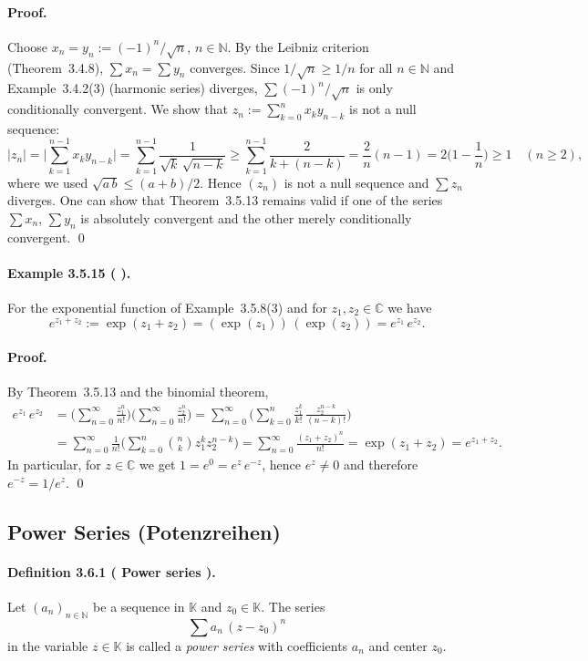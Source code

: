 \documentclass[12pt,a4paper]{article}
\newcommand{\N}{\mathbb{N}}
\newcommand{\C}{\mathbb{C}}
\newcommand{\K}{\mathbb{K}} %
\newcommand{\NumberedDefinition}[3]{%
\paragraph*{Definition #1 ( #2 ).} #3\par}
\newcommand{\NumberedExample}[3]{%
\paragraph*{Example #1 ( #2 ).} #3\par}
\theoremstyle{plain}
\theoremstyle{definition}
\theoremstyle{remark}
\begin{document}
	\paragraph{Proof.}
	Choose $x_n=y_n:=(-1)^n/\sqrt{n}$, $n\in\N$. By the Leibniz criterion (Theorem~3.4.8), $\sum x_n = \sum y_n$ converges. Since $1/\sqrt{n} \ge 1/n$ for all $n\in\N$ and Example~3.4.2(3) (harmonic series) diverges, $\sum (-1)^n/\sqrt{n}$ is only conditionally convergent. We show that $z_n := \sum_{k=0}^{n} x_k y_{n-k}$ is not a null sequence:
	\[
		|z_n| = \Bigg| \sum_{k=1}^{n-1} x_k y_{n-k} \Bigg| = \sum_{k=1}^{n-1} \frac{1}{\sqrt{k}\,\sqrt{n-k}} 
			\ge \sum_{k=1}^{n-1} \frac{2}{k+(n-k)} = \frac{2}{n}(n-1) = 2\Big(1-\frac{1}{n}\Big) \ge 1 \quad (n\ge2),
	\]
	where we used $\sqrt{a\,b} \le (a+b)/2$. Hence $(z_n)$ is not a null sequence and $\sum z_n$ diverges. One can show that Theorem~3.5.13 remains valid if one of the series $\sum x_n$, $\sum y_n$ is absolutely convergent and the other merely conditionally convergent. \qed

	\NumberedExample{3.5.15}{}{For the exponential function of Example~3.5.8(3) and for $z_1,z_2\in\C$ we have
	\[
		e^{z_1+z_2} := \exp(z_1+z_2) = (\exp(z_1))\,(\exp(z_2)) = e^{z_1}\,e^{z_2}.
	\]}
	\paragraph{Proof.}
	By Theorem~3.5.13 and the binomial theorem,
	\begin{align*}
		e^{z_1}\,e^{z_2}
			&= \Big( \sum_{n=0}^{\infty} \frac{z_1^{n}}{n!} \Big)
				 \Big( \sum_{n=0}^{\infty} \frac{z_2^{n}}{n!} \Big)
			 = \sum_{n=0}^{\infty} \Big( \sum_{k=0}^{n} \frac{z_1^{k}}{k!}\,\frac{z_2^{n-k}}{(n-k)!} \Big) \\
			&= \sum_{n=0}^{\infty} \frac{1}{n!} \Big( \sum_{k=0}^{n} \binom{n}{k} z_1^{k} z_2^{n-k} \Big)
			 = \sum_{n=0}^{\infty} \frac{(z_1+z_2)^n}{n!}
			 = \exp(z_1+z_2) = e^{z_1+z_2}.
	\end{align*}
	In particular, for $z\in\C$ we get $1 = e^{0} = e^{z}\,e^{-z}$, hence $e^{z}\ne0$ and therefore $e^{-z} = 1/e^{z}$. \qed
	
\subsection{Power Series (Potenzreihen)}

\NumberedDefinition{3.6.1}{Power series}{Let $(a_n)_{n\in\N}$ be a sequence in $\K$ and $z_0\in\K$. The series
\[
	\sum a_n\,(z-z_0)^{n}
\]
in the variable $z\in\K$ is called a \emph{power series} with coefficients $a_n$ and center $z_0$.}
\end{document}

